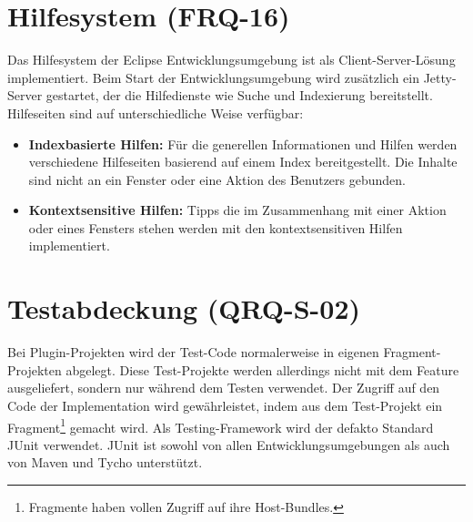 \section{Hilfesystem (FRQ-16)}
Das Hilfesystem der Eclipse Entwicklungsumgebung ist als Client-Server-Lösung implementiert. Beim Start der Entwicklungsumgebung wird zusätzlich ein Jetty-Server gestartet, der die Hilfedienste wie Suche und Indexierung bereitstellt. Hilfeseiten sind auf unterschiedliche Weise verfügbar:
\begin{itemize}
\item \textbf{Indexbasierte Hilfen:} Für die generellen Informationen und Hilfen werden verschiedene Hilfeseiten basierend auf einem Index bereitgestellt. Die Inhalte sind nicht an ein Fenster oder eine Aktion des Benutzers gebunden. 
\item \textbf{Kontextsensitive Hilfen:} Tipps die im Zusammenhang mit einer Aktion oder eines Fensters stehen werden mit den kontextsensitiven Hilfen implementiert.
\end{itemize}

\section{Testabdeckung (QRQ-S-02)}\label{testing}
Bei Plugin-Projekten wird der Test-Code normalerweise in eigenen Fragment-Projekten abgelegt. Diese Test-Projekte werden allerdings nicht mit dem Feature ausgeliefert, sondern nur während dem Testen verwendet. Der Zugriff auf den Code der Implementation wird gewährleistet, indem aus dem Test-Projekt ein Fragment\footnote{Fragmente haben vollen Zugriff auf ihre Host-Bundles.} gemacht wird. Als Testing-Framework wird der defakto Standard JUnit verwendet. JUnit ist sowohl von allen Entwicklungsumgebungen als auch von Maven und Tycho unterstützt.

